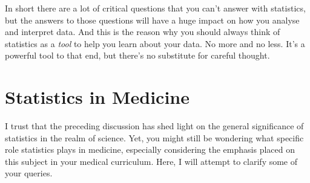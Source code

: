 In short there are a lot of critical questions that you can't answer with statistics, but the answers to those questions will have a huge impact on how you analyse and interpret data. And this is the reason why you should always think of statistics as a {\it tool} to help you learn about your data. No more and no less. It's a powerful tool to that end, but there's no substitute for careful thought.


\section{Statistics in Medicine}

I trust that the preceding discussion has shed light on the general significance of statistics in the realm of science. Yet, you might still be wondering what specific role statistics plays in medicine, especially considering the emphasis placed on this subject in your medical curriculum. Here, I will attempt to clarify some of your queries.

